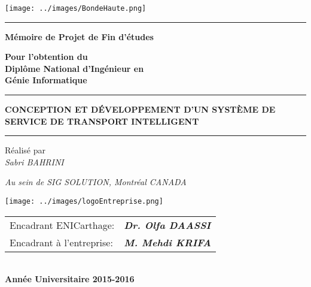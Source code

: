 \documentclass[12pt,a4paper]{report}
\begin{document}
\pagestyle{fancy}
\renewcommand{\headrulewidth}{0.0pt}
\renewcommand{\footrulewidth}{0.2pt}
\lfoot{}
\rfoot{}
\vspace*{1mm}

\begin{center}
\texttt{[image: ../images/BondeHaute.png]} 
\end{center}

\vspace{5mm}
\hrule

\vspace{10mm}

\begin{center}
\textbf{\huge Mémoire de Projet de Fin d'études\\}

\vspace{10mm}

\textbf{\large{Pour l'obtention du \\ \vspace{5mm} Diplôme National d'Ingénieur en \\ Génie Informatique\\}}
\vspace{10mm}

\hrule

\vspace{10mm}
\textbf{\large CONCEPTION ET DÉVELOPPEMENT D'UN SYSTÈME DE SERVICE DE TRANSPORT INTELLIGENT}
\vspace{10mm}
\hrule
\vspace{10mm}
Réalisé par\\
\vspace{5mm}
\textit{\Large{Sabri BAHRINI}}\\
\vspace{10mm}

\textit{Au sein de SIG SOLUTION, Montréal CANADA\\}

\vspace{5mm}

\texttt{[image: ../images/logoEntreprise.png]} 

\vspace{5mm}
\vspace{15mm}
\begin{tabular}{ll}
			\textcolor[rgb]{0.4,0.4,0.4}{Encadrant ENICarthage:} &  \textbf{\textit{Dr. Olfa DAASSI }} \\						\textcolor[rgb]{0.4,0.4,0.4}{Encadrant à l'entreprise:} &  \textbf{\textit{M. Mehdi KRIFA}} \\	
\end{tabular} 
\\
\vspace{20mm}
\textbf{Année Universitaire 2015-2016}
\end{center}
\end{document}
